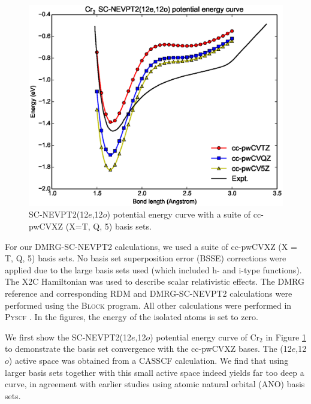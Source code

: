 \begin{figure}
  \includegraphics[width=1.1\columnwidth]{Cr2-nevpt2.eps}
  \caption{SC-NEVPT2(12$e$,12$o$) potential energy curve with a suite of cc-pwCVXZ (X=T, Q, 5) basis sets. }
  \label{fig:12o_nevpt2}
\end{figure}

For our DMRG-SC-NEVPT2 calculations, we used a suite of cc-pwCVXZ (X = T, Q, 5) basis sets. No basis set superposition error (BSSE) corrections were applied 
due to the large basis sets used (which included h- and i-type functions). The X2C Hamiltonian was used to describe scalar relativistic effects. 
The DMRG reference and corresponding RDM and DMRG-SC-NEVPT2 calculations were performed using the \textsc{Block} program\cite{sharma_spin-adapted_2012}. 
All other calculations were performed in \textsc{Pyscf} \cite{sun_pyscf}. In the figures, the energy of the isolated atoms is set to zero.

We first show the SC-NEVPT2(12$e$,12$o$) potential energy curve of Cr$_2$ in Figure \ref{fig:12o_nevpt2} 
to demonstrate the basis set convergence with the cc-pwCVXZ bases. The (12$e$,12$o$) active space was obtained from a CASSCF calculation. We find that
using larger basis sets together with this small active space indeed yields far too deep a curve, in agreement with earlier studies  using atomic natural orbital (ANO) basis sets.~\cite{angeli_third-order_2006}

